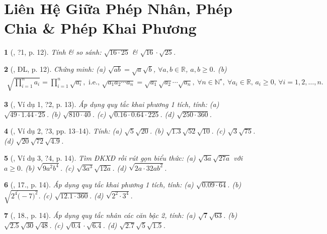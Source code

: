 \documentclass{article}
\newtheorem{baitoan}{}%
\begin{document}
\section{Liên Hệ Giữa Phép Nhân, Phép Chia \& Phép Khai Phương}

\begin{baitoan}[\cite{SGK_Toan_9_tap_1}, ?1, p. 12]
	Tính \& so sánh: $\sqrt{16\cdot25}$ \& $\sqrt{16}\cdot\sqrt{25}$.	
\end{baitoan}

\begin{baitoan}[\cite{SGK_Toan_9_tap_1}, ĐL, p. 12]
	Chứng minh: (a) $\sqrt{ab} = \sqrt{a}\sqrt{b}$, $\forall a,b\in\mathbb{R}$, $a,b\ge0$. (b)
	\begin{align*}
		\sqrt{\prod_{i=1}^n a_i} = \prod_{i=1}^n \sqrt{a_i},\mbox{ i.e., }\sqrt{a_1a_2\cdots a_n} = \sqrt{a_1}\sqrt{a_2}\cdots\sqrt{a_n},\ \forall n\in\mathbb{N}^\star,\ \forall a_i\in\mathbb{R},\,a_i\ge0,\,\forall i = 1,2,\ldots,n.
	\end{align*}
\end{baitoan}

\begin{baitoan}[\cite{SGK_Toan_9_tap_1}, Ví dụ 1, ?2, p. 13]
	Áp dụng quy tắc khai phương 1 tích, tính: (a) $\sqrt{49\cdot1.44\cdot25}$. (b) $\sqrt{810\cdot40}$. (c) $\sqrt{0.16\cdot0.64\cdot225}$. (d) $\sqrt{250\cdot360}$.
\end{baitoan}

\begin{baitoan}[\cite{SGK_Toan_9_tap_1}, Ví dụ 2, ?3, pp. 13--14]
	Tính: (a) $\sqrt{5}\sqrt{20}$. (b) $\sqrt{1.3}\sqrt{52}\sqrt{10}$. (c) $\sqrt{3}\sqrt{75}$. (d) $\sqrt{20}\sqrt{72}\sqrt{4.9}$.
\end{baitoan}

\begin{baitoan}[\cite{SGK_Toan_9_tap_1}, Ví dụ 3, ?4, p. 14]
	Tìm ĐKXĐ rồi rút gọn biểu thức: (a) $\sqrt{3a}\sqrt{27a}$ với $a\ge0$. (b) $\sqrt{9a^2b^4}$. (c) $\sqrt{3a^3}\sqrt{12a}$. (d) $\sqrt{2a\cdot32ab^2}$.
\end{baitoan}

\begin{baitoan}[\cite{SGK_Toan_9_tap_1}, 17., p. 14]
	Áp dụng quy tắc khai phương 1 tích, tính: (a) $\sqrt{0.09\cdot64}$. (b) $\sqrt{2^4\dot(-7)^2}$. (c) $\sqrt{12.1\cdot360}$. (d) $\sqrt{2^2\cdot3^4}$.
\end{baitoan}

\begin{baitoan}[\cite{SGK_Toan_9_tap_1}, 18., p. 14]
	Áp dụng quy tắc nhân các căn bậc 2, tính: (a) $\sqrt{7}\sqrt{63}$. (b) $\sqrt{2.5}\sqrt{30}\sqrt{48}$. (c) $\sqrt{0.4}\cdot\sqrt{6.4}$. (d) $\sqrt{2.7}\sqrt{5}\sqrt{1.5}$.
\end{baitoan}
\end{document}
